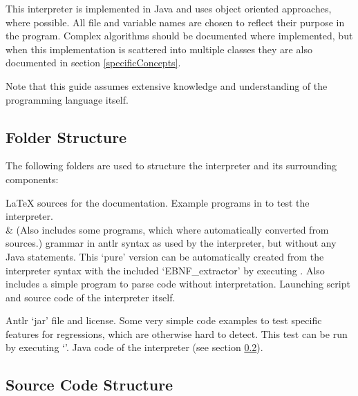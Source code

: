 This interpreter is implemented in Java and uses object oriented approaches, where possible. All file and variable names are chosen to reflect their purpose in the program. Complex algorithms should be documented where implemented, but when this implementation is scattered into multiple classes they are also documented in section \ref{specificConcepts}.

Note that this guide assumes extensive knowledge and understanding of the \SetlX{} programming language itself.


\subsection{Folder Structure}

The following folders are used to structure the interpreter and its surrounding components:

\begin{itemize}
			{\LaTeX{} sources for the documentation.}
			{Example programs in \SetlX{} to test the interpreter.\\&
			 (Also includes some programs, which where automatically converted from \SetlTwo{} sources.)}
			{\SetlX{} grammar in antlr syntax as used by the interpreter, but without any Java statements. This `pure' version can be automatically created from the interpreter syntax with the included `EBNF\_extractor' by executing . Also includes a simple program to parse \SetlX{} code without interpretation.}
			{Launching script and source code of the interpreter itself.}
	\begin{itemize}
				{Antlr `jar' file and license.}
				{Some very simple \SetlX{} code examples to test specific features for regressions, which are otherwise hard to detect. This test can be run by executing `'.}
				{Java code of the interpreter (see section \ref{srcStructure}).}
	\end{itemize}
\end{itemize}

\subsection{Source Code Structure}\label{srcStructure}

